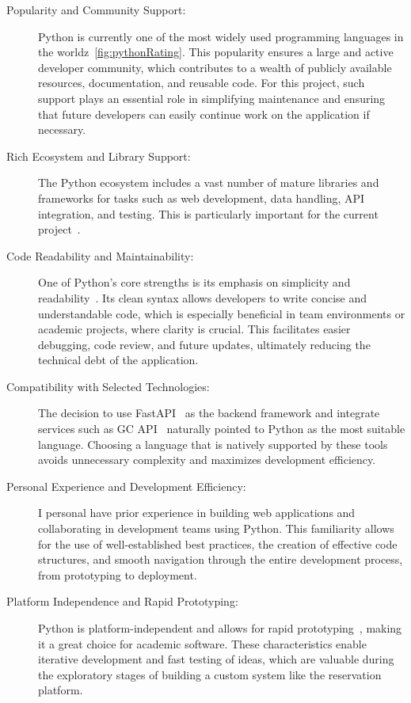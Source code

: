\begin{description}
  \item [Popularity and Community Support:] Python is currently one of the most widely used programming languages in the worldz~\ref{fig:pythonRating}. This popularity ensures a large and active developer community, which contributes to a wealth of publicly available resources, documentation, and reusable code. For this project, such support plays an essential role in simplifying maintenance and ensuring that future developers can easily continue work on the application if necessary.
  \item [Rich Ecosystem and Library Support:] The Python ecosystem includes a vast number of mature libraries and frameworks for tasks such as web development, data handling, API integration, and testing. This is particularly important for the current project~\cite{pythonEcosystem}.
  \item [Code Readability and Maintainability:] One of Python’s core strengths is its emphasis on simplicity and readability~\cite{pythonReadability}. Its clean syntax allows developers to write concise and understandable code, which is especially beneficial in team environments or academic projects, where clarity is crucial. This facilitates easier debugging, code review, and future updates, ultimately reducing the technical debt of the application.
  \item [Compatibility with Selected Technologies:] The decision to use FastAPI~\cite{fastAPI} as the backend framework and integrate services such as GC API~\cite{googleCalendarAPI} naturally pointed to Python as the most suitable language. Choosing a language that is natively supported by these tools avoids unnecessary complexity and maximizes development efficiency.
  \item [Personal Experience and Development Efficiency:] I personal have prior experience in building web applications and collaborating in development teams using Python. This familiarity allows for the use of well-established best practices, the creation of effective code structures, and smooth navigation through the entire development process, from prototyping to deployment.
  \item [Platform Independence and Rapid Prototyping:] Python is platform-independent and allows for rapid prototyping~\cite{pythonIndependent}, making it a great choice for academic software. These characteristics enable iterative development and fast testing of ideas, which are valuable during the exploratory stages of building a custom system like the reservation platform.
\end{description}

